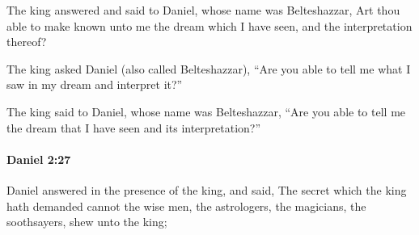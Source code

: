 			\begin{versebox}
					\item[BHS] 
					\item[LXX] 
					\item[ASV] The king answered and said to Daniel, whose name was Belteshazzar, Art thou able to make known unto me the dream which I have seen, and the interpretation thereof?
					\item[NIV] The king asked Daniel (also called Belteshazzar), “Are you able to tell me what I saw in my dream and interpret it?”
					\item[NRSV] The king said to Daniel, whose name was Belteshazzar, “Are you able to tell me the dream that I have seen and its interpretation?”
			\end{versebox}

		\paragraph{Daniel 2:27} %
			\label{DANIEL-2-27}

			Daniel answered in the presence of the king, and said, The secret which the king hath demanded cannot the wise men, the astrologers, the magicians, the soothsayers, shew unto the king;

